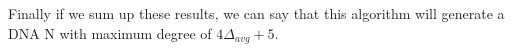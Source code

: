 \documentclass{article}
\begin{document}

\medskip

Finally if we sum up these results, we can say that this algorithm will
generate a DNA N with maximum degree of $4\Delta_{avg} + 5$.
\end{document}

